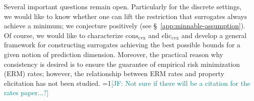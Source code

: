\documentclass[11pt]{article} %
\newcommand{\Comments}{1}
\newcommand{\mynote}[2]{\ifnum\Comments=1\textcolor{#1}{#2}\fi}
\newcommand{\jessie}[1]{\mynote{teal}{[JF: #1]}}
\newcommand{\reals}{\mathbb{R}}
\newcommand{\eliccvx}{\mathrm{elic}_\mathrm{cvx}}
\newcommand{\conscvx}{\mathrm{cons}_\mathrm{cvx}}
\newcommand{\Y}{\mathcal{Y}}
\begin{document}
Several important questions remain open.
Particularly for the discrete settings, we would like to know whether one can lift the restriction that surrogates always achieve a minimum; we conjecture positively (see \S~\ref{app:minnable-assumption}).
Of course, we would like to characterize $\conscvx$ and $\eliccvx$ and develop a general framework for constructing surrogates achieving the best possible bounds for a given notion of prediction dimension.
Moreover, the practical reason why consistency is desired is to ensure the guarantee of empirical risk minimization (ERM) rates; however, the relationship between ERM rates and property elicitation has not been studied.
\jessie{Not sure if there will be a citation for the rates paper...?}

\newpage
\end{document}

